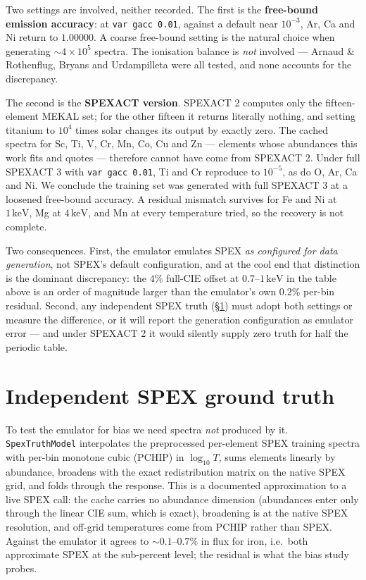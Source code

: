 \documentclass[11pt,a4paper]{article}
\newcommand{\kev}{\,\mathrm{keV}}
\newcommand{\code}[1]{\texttt{#1}}
\begin{document}
Two settings are involved, neither recorded. The first is the \textbf{free-bound
emission accuracy}: at \code{var gacc 0.01}, against a default near $10^{-3}$,
Ar, Ca and Ni return to $1.00000$. A coarse free-bound setting is the natural
choice when generating $\sim\!4\times10^{5}$ spectra. The ionisation balance is
\emph{not} involved --- Arnaud \& Rothenflug, Bryans and Urdampilleta were all
tested, and none accounts for the discrepancy.

The second is the \textbf{SPEXACT version}. SPEXACT 2 computes only the
fifteen-element MEKAL set; for the other fifteen it returns literally nothing,
and setting titanium to $10^{4}$ times solar changes its output by exactly
zero. The cached spectra for Sc, Ti, V, Cr, Mn, Co, Cu and Zn --- elements whose
abundances this work fits and quotes --- therefore cannot have come from
SPEXACT 2. Under full SPEXACT 3 with \code{var gacc 0.01}, Ti and Cr reproduce
to $10^{-5}$, as do O, Ar, Ca and Ni. We conclude the training set was
generated with full SPEXACT 3 at a loosened free-bound accuracy. A residual
mismatch survives for Fe and Ni at $1\kev$, Mg at $4\kev$, and Mn at every
temperature tried, so the recovery is not complete.

Two consequences. First, the emulator emulates SPEX \emph{as configured for
data generation}, not SPEX's default configuration, and at the cool end that
distinction is the dominant discrepancy: the $4\%$ full-CIE offset at
$0.7$--$1\kev$ in the table above is an order of magnitude larger than the
emulator's own $0.2\%$ per-bin residual. Second, any independent SPEX truth
(\S\ref{sec:truth}) must adopt both settings or measure the difference, or it
will report the generation configuration as emulator error --- and under
SPEXACT 2 it would silently supply zero truth for half the periodic table.

\section{Independent SPEX ground truth}\label{sec:truth}
To test the emulator for bias we need spectra \emph{not} produced by it.
\code{SpexTruthModel} interpolates the preprocessed per-element SPEX training
spectra with per-bin monotone cubic (PCHIP) in $\log_{10}T$, sums elements
linearly by abundance, broadens with the exact redistribution matrix on the
native SPEX grid, and folds through the response. This is a documented
approximation to a live SPEX call: the cache carries no abundance dimension
(abundances enter only through the linear CIE sum, which is exact), broadening
is at the native SPEX resolution, and off-grid temperatures come from PCHIP
rather than SPEX. Against the emulator it agrees to $\sim0.1$--$0.7\%$ in flux
for iron, i.e.\ both approximate SPEX at the sub-percent level; the residual is
what the bias study probes.
\end{document}
